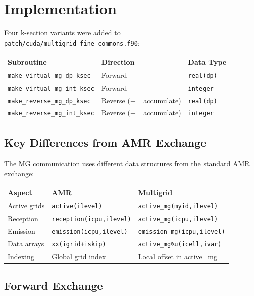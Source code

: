 \documentclass[11pt,fleqn]{book}
\begin{document}
\section{Implementation}

Four k-section variants were added to \texttt{patch/cuda/multigrid\_fine\_commons.f90}:

\begin{center}
\begin{tabular}{lll}
\toprule
\textbf{Subroutine} & \textbf{Direction} & \textbf{Data Type} \\
\midrule
\texttt{make\_virtual\_mg\_dp\_ksec} & Forward & \texttt{real(dp)} \\
\texttt{make\_virtual\_mg\_int\_ksec} & Forward & \texttt{integer} \\
\texttt{make\_reverse\_mg\_dp\_ksec} & Reverse (+= accumulate) & \texttt{real(dp)} \\
\texttt{make\_reverse\_mg\_int\_ksec} & Reverse (+= accumulate) & \texttt{integer} \\
\bottomrule
\end{tabular}
\end{center}

\subsection{Key Differences from AMR Exchange}

The MG communication uses different data structures from the standard AMR exchange:

\begin{center}
\begin{tabular}{lll}
\toprule
\textbf{Aspect} & \textbf{AMR} & \textbf{Multigrid} \\
\midrule
Active grids & \texttt{active(ilevel)} & \texttt{active\_mg(myid,ilevel)} \\
Reception & \texttt{reception(icpu,ilevel)} & \texttt{active\_mg(icpu,ilevel)} \\
Emission & \texttt{emission(icpu,ilevel)} & \texttt{emission\_mg(icpu,ilevel)} \\
Data arrays & \texttt{xx(igrid+iskip)} & \texttt{active\_mg\%u(icell,ivar)} \\
Indexing & Global grid index & Local offset in active\_mg \\
\bottomrule
\end{tabular}
\end{center}

\subsection{Forward Exchange}
\end{document}

